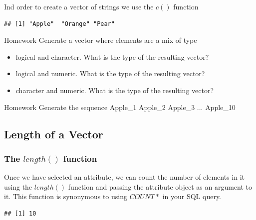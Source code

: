 \noindent Ind order to create a vector of strings we use the $c()$ function
\begin{knitrout}
\color{fgcolor}\begin{kframe}
\begin{alltt}
\hlkwb{<-} \hlstd{(}\hlstd{,}\hlstd{,}\hlstd{)} 
\end{alltt}
\begin{verbatim}
## [1] "Apple"  "Orange" "Pear"
\end{verbatim}
\end{kframe}
\end{knitrout}

\begin{DIY}{Homework}
Generate a vector where elements are a mix of type
\begin{itemize}
  \item logical and character. What is the type of the resulting vector?
  \item logical and numeric. What is the type of the resulting vector?
  \item character and numeric. What is the type of the resulting vector?
\end{itemize}
\end{DIY}

\begin{DIY}{Homework}
Generate the sequence Apple\_1 Apple\_2 Apple\_3 ... Apple\_10
\end{DIY}

\subsection{Length of a Vector}
\subsubsection{The $length()$ function}
\noindent Once we have selected an attribute, we can count the number of elements in it using the $length()$  function and passing the attribute object as an argument to it. This function is synonymous to using $COUNT*$ in your SQL query.
\begin{knitrout}
\color{fgcolor}\begin{kframe}
\begin{alltt}
 \hlkwb{<-} \hlstd{(}\hlstd{,}\hlstd{)} 
 
\end{alltt}
\begin{verbatim}
## [1] 10
\end{verbatim}
\end{kframe}
\end{knitrout}
